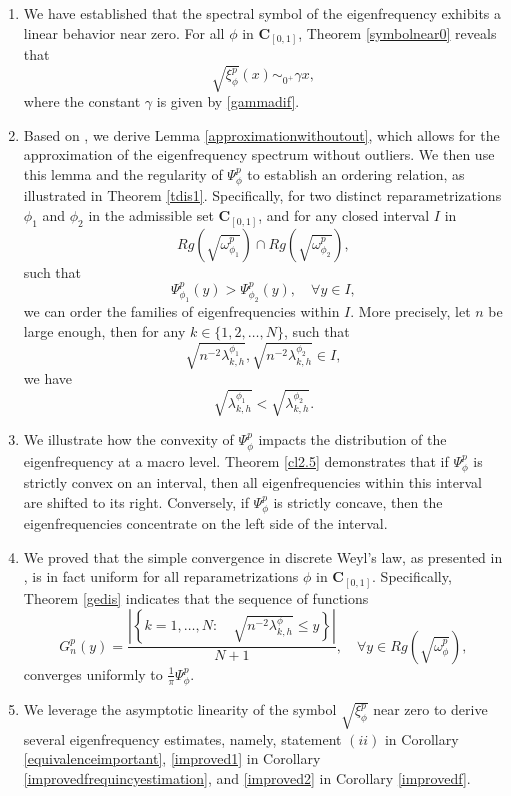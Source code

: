 \documentclass[11pt]{article}
\begin{document}
\begin{enumerate}
\item  We have established that the spectral symbol of the eigenfrequency exhibits a linear behavior near zero. For all \( \phi \) in \( \mathbf{C}_{[0,1]} \), Theorem \ref{symbolnear0} reveals that  
   \[
   \sqrt{\xi_{\phi}^p}(x)\sim_{0^+} \gamma x,
   \]
   where the constant \( \gamma \) is given by \eqref{gammadif}.

\item Based on \cite{bianchi2021analysis}, we derive Lemma \ref{approximationwithoutout}, which allows for the approximation of the eigenfrequency spectrum without outliers. We then use this lemma and the regularity of \( \Psi^p_{\phi} \) to establish an ordering relation, as illustrated in Theorem \ref{tdis1}. Specifically, for two distinct reparametrizations \( \phi_1 \) and \( \phi_2 \) in the admissible set \( \mathbf{C}_{[0,1]} \), and for any closed interval \( I \) in  
   \[
   Rg\left(\sqrt{\omega_{\phi_1}^p}\right) \cap Rg\left(\sqrt{\omega_{\phi_2}^p}\right),
   \]
   such that  
   \[
   \Psi_{\phi_1}^{p}(y)>\Psi_{\phi_2}^{p}(y),\quad \forall y\in  I,
   \]
   we can order the families of eigenfrequencies within \( I \). More precisely, let \( n \) be large enough, then for any \( k\in\{1,2,\dots,N\} \), such that  
   \[
   \sqrt{n^{-2}\lambda^{\phi_1}_{k,h}},\sqrt{n^{-2}\lambda^{\phi_2}_{k,h}}\in I,
   \]
   we have  
   \[
   \sqrt{\lambda_{k,h}^{\phi_1}}<\sqrt{\lambda_{k,h}^{\phi_2}}.
   \]

\item  We illustrate how the convexity of \( \Psi_{\phi}^p \) impacts the distribution of the eigenfrequency at a macro level. Theorem \ref{cl2.5} demonstrates that if \( \Psi_{\phi}^p \) is strictly convex on an interval, then all eigenfrequencies within this interval are shifted to its right. Conversely, if \( \Psi_{\phi}^p \) is strictly concave, then the eigenfrequencies concentrate on the left side of the interval.

\item We proved that the simple convergence in discrete Weyl's law, as presented in \cite[Theorem 3.1]{bianchi2021analysis}, is in fact uniform for all reparametrizations \( \phi \) in \( \mathbf{C}_{[0,1]} \). Specifically, Theorem \ref{gedis} indicates that the sequence of functions  
   \[
   G_n^p(y)= \dfrac{\left| \left\{k=1,\dots, N:\quad \sqrt{n^{-2}\lambda_{k,h}^{\phi}}\leq y\right\}\right|}{N+1},\quad \forall y\in Rg\left(\sqrt{\omega_{\phi}^p}\right),
   \]
   converges uniformly to  \( \frac{1}{\pi}\Psi^p_{\phi} \).
   
\item We leverage the asymptotic linearity of the symbol \( \sqrt{\xi^p_{\phi}} \) near zero to derive several eigenfrequency estimates, namely,  statement \( (ii) \) in Corollary \ref{equivalenceimportant}, \eqref{improved1} in Corollary \ref{improvedfrequincyestimation}, and \eqref{improved2} in Corollary \ref{improvedf}.
\end{enumerate}
\end{document}
